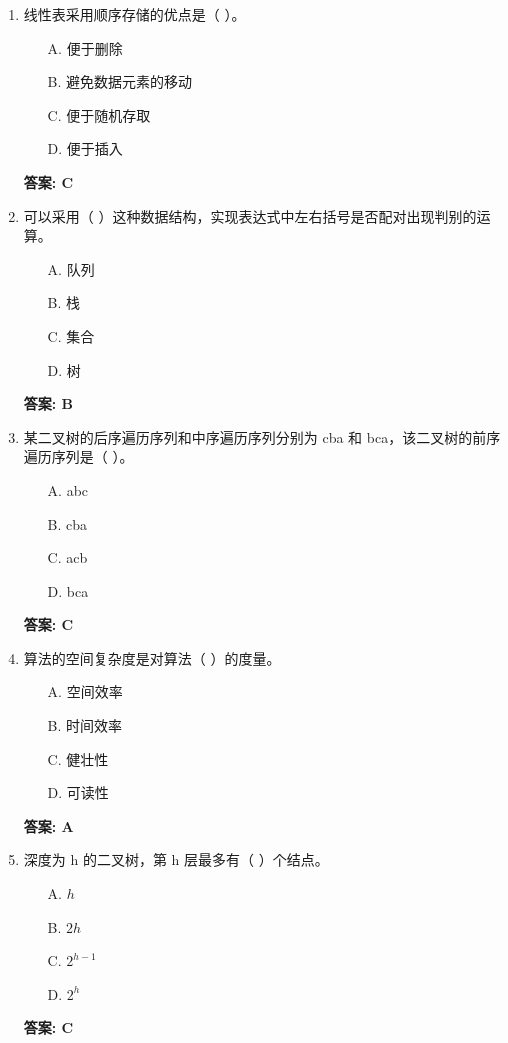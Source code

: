 \documentclass[12pt, a4paper]{article}
\begin{document}
\begin{enumerate}
    \item 线性表采用顺序存储的优点是（ ）。
    \begin{enumerate}
        \item[A.] 便于删除
        \item[B.] 避免数据元素的移动
        \item[C.] 便于随机存取
        \item[D.] 便于插入
    \end{enumerate}
    \textbf{答案: C}

    \item 可以采用（ ）这种数据结构，实现表达式中左右括号是否配对出现判别的运算。
    \begin{enumerate}
        \item[A.] 队列
        \item[B.] 栈
        \item[C.] 集合
        \item[D.] 树
    \end{enumerate}
    \textbf{答案: B}

    \item 某二叉树的后序遍历序列和中序遍历序列分别为 cba 和 bca，该二叉树的前序遍历序列是（ ）。
    \begin{enumerate}
        \item[A.] abc
        \item[B.] cba
        \item[C.] acb
        \item[D.] bca
    \end{enumerate}
    \textbf{答案: C}

    \item 算法的空间复杂度是对算法（ ）的度量。
    \begin{enumerate}
        \item[A.] 空间效率
        \item[B.] 时间效率
        \item[C.] 健壮性
        \item[D.] 可读性
    \end{enumerate}
    \textbf{答案: A}

    \item 深度为 h 的二叉树，第 h 层最多有（ ）个结点。
    \begin{enumerate}
        \item[A.] $h$
        \item[B.] $2h$
        \item[C.] $2^{h-1}$
        \item[D.] $2^h$
    \end{enumerate}
    \textbf{答案: C}


\end{enumerate}
\end{document}
